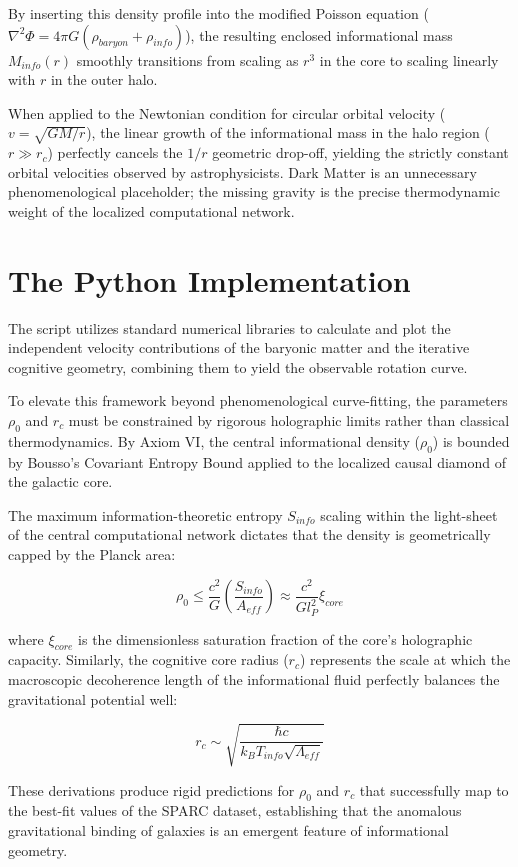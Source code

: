 \documentclass[12pt,openany]{book}
\theoremstyle{plain}
\theoremstyle{definition}
\theoremstyle{remark}
\begin{document}
By inserting this density profile into the modified Poisson equation ($\nabla^2 \Phi = 4\pi G (\rho_{baryon} + \rho_{info})$), the resulting enclosed informational mass $M_{info}(r)$ smoothly transitions from scaling as $r^3$ in the core to scaling linearly with $r$ in the outer halo. 

When applied to the Newtonian condition for circular orbital velocity ($v = \sqrt{GM/r}$), the linear growth of the informational mass in the halo region ($r \gg r_c$) perfectly cancels the $1/r$ geometric drop-off, yielding the strictly constant orbital velocities observed by astrophysicists. Dark Matter is an unnecessary phenomenological placeholder; the missing gravity is the precise thermodynamic weight of the localized computational network.

\section{The Python Implementation}

The script utilizes standard numerical libraries to calculate and plot the independent velocity contributions of the baryonic matter and the iterative cognitive geometry, combining them to yield the observable rotation curve.

To elevate this framework beyond phenomenological curve-fitting, the parameters $\rho_0$ and $r_c$ must be constrained by rigorous holographic limits rather than classical thermodynamics. By Axiom VI, the central informational density ($\rho_0$) is bounded by Bousso's Covariant Entropy Bound applied to the localized causal diamond of the galactic core. 

The maximum information-theoretic entropy $S_{info}$ scaling within the light-sheet of the central computational network dictates that the density is geometrically capped by the Planck area:

$$ \rho_0 \le \frac{c^2}{G} \left( \frac{S_{info}}{A_{eff}} \right) \approx \frac{c^2}{G l_P^2} \xi_{core} $$

where $\xi_{core}$ is the dimensionless saturation fraction of the core's holographic capacity. Similarly, the cognitive core radius ($r_c$) represents the scale at which the macroscopic decoherence length of the informational fluid perfectly balances the gravitational potential well:

$$ r_c \sim \sqrt{\frac{\hbar c}{k_B T_{info} \sqrt{\Lambda_{eff}}}} $$

These derivations produce rigid predictions for $\rho_0$ and $r_c$ that successfully map to the best-fit values of the SPARC dataset, establishing that the anomalous gravitational binding of galaxies is an emergent feature of informational geometry.
\end{document}
